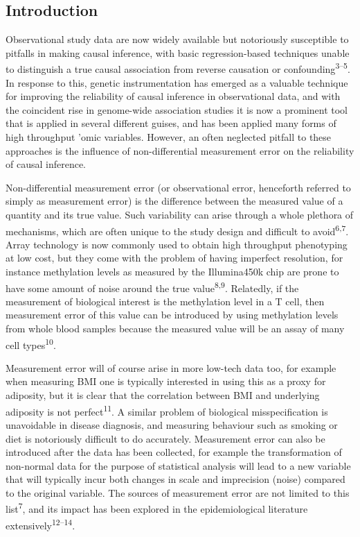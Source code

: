 \documentclass[]{article}
\begin{document}
\subsection{Introduction}\label{introduction}

Observational study data are now widely available but notoriously
susceptible to pitfalls in making causal inference, with basic
regression-based techniques unable to distinguish a true causal
association from reverse causation or confounding\textsuperscript{3--5}.
In response to this, genetic instrumentation has emerged as a valuable
technique for improving the reliability of causal inference in
observational data, and with the coincident rise in genome-wide
association studies it is now a prominent tool that is applied in
several different guises, and has been applied many forms of high
throughput 'omic variables. However, an often neglected pitfall to these
approaches is the influence of non-differential measurement error on the
reliability of causal inference.

Non-differential measurement error (or observational error, henceforth
referred to simply as measurement error) is the difference between the
measured value of a quantity and its true value. Such variability can
arise through a whole plethora of mechanisms, which are often unique to
the study design and difficult to avoid\textsuperscript{6,7}. Array
technology is now commonly used to obtain high throughput phenotyping at
low cost, but they come with the problem of having imperfect resolution,
for instance methylation levels as measured by the Illumina450k chip are
prone to have some amount of noise around the true
value\textsuperscript{8,9}. Relatedly, if the measurement of biological
interest is the methylation level in a T cell, then measurement error of
this value can be introduced by using methylation levels from whole
blood samples because the measured value will be an assay of many cell
types\textsuperscript{10}.

Measurement error will of course arise in more low-tech data too, for
example when measuring BMI one is typically interested in using this as
a proxy for adiposity, but it is clear that the correlation between BMI
and underlying adiposity is not perfect\textsuperscript{11}. A similar
problem of biological misspecification is unavoidable in disease
diagnosis, and measuring behaviour such as smoking or diet is
notoriously difficult to do accurately. Measurement error can also be
introduced after the data has been collected, for example the
transformation of non-normal data for the purpose of statistical
analysis will lead to a new variable that will typically incur both
changes in scale and imprecision (noise) compared to the original
variable. The sources of measurement error are not limited to this
list\textsuperscript{7}, and its impact has been explored in the
epidemiological literature extensively\textsuperscript{12--14}.
\end{document}
